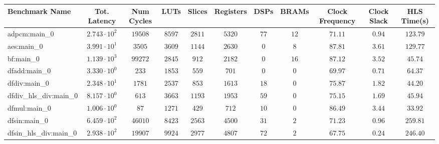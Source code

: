 \begin{tabular}{|l|c|c|c|c|c|c|c|c|c|c|}
\hline
Benchmark Name          & Tot. Latency           & Num Cycles & LUTs      & Slices    & Registers & DSPs    & BRAMs   & Clock Frequency & Clock Slack & HLS Time(s) \\
\hline
adpcm:main\_0           & $ 2.743 \cdot 10^{2} $ & $ 19508  $ & $ 8597  $ & $ 2811  $ & $ 5320  $ & $ 77  $ & $ 12  $ & $ 71.11       $ & $ 0.94    $ & $ 123.79  $ \\
aes:main\_0             & $ 3.991 \cdot 10^{1} $ & $ 3505   $ & $ 3609  $ & $ 1144  $ & $ 2630  $ & $ 0   $ & $ 8   $ & $ 87.81       $ & $ 3.61    $ & $ 129.77  $ \\
bf:main\_0              & $ 1.139 \cdot 10^{3} $ & $ 99272  $ & $ 2845  $ & $ 912   $ & $ 2182  $ & $ 0   $ & $ 16  $ & $ 87.12       $ & $ 3.52    $ & $ 45.74   $ \\
dfadd:main\_0           & $ 3.330 \cdot 10^{0} $ & $ 233    $ & $ 1853  $ & $ 559   $ & $ 701   $ & $ 0   $ & $ 0   $ & $ 69.97       $ & $ 0.71    $ & $ 64.37   $ \\
dfdiv:main\_0           & $ 2.348 \cdot 10^{1} $ & $ 1781   $ & $ 2537  $ & $ 853   $ & $ 1613  $ & $ 18  $ & $ 0   $ & $ 75.87       $ & $ 1.82    $ & $ 44.20   $ \\
dfdiv\_hls\_div:main\_0 & $ 8.157 \cdot 10^{0} $ & $ 613    $ & $ 3663  $ & $ 1193  $ & $ 1953  $ & $ 59  $ & $ 0   $ & $ 75.15       $ & $ 1.69    $ & $ 45.94   $ \\
dfmul:main\_0           & $ 1.006 \cdot 10^{0} $ & $ 87     $ & $ 1271  $ & $ 429   $ & $ 712   $ & $ 10  $ & $ 0   $ & $ 86.49       $ & $ 3.44    $ & $ 33.92   $ \\
dfsin:main\_0           & $ 6.459 \cdot 10^{2} $ & $ 46010  $ & $ 8423  $ & $ 2563  $ & $ 4500  $ & $ 31  $ & $ 2   $ & $ 71.23       $ & $ 0.96    $ & $ 259.81  $ \\
dfsin\_hls\_div:main\_0 & $ 2.938 \cdot 10^{2} $ & $ 19907  $ & $ 9924  $ & $ 2977  $ & $ 4807  $ & $ 72  $ & $ 2   $ & $ 67.75       $ & $ 0.24    $ & $ 246.40  $ \\

\end{tabular}
